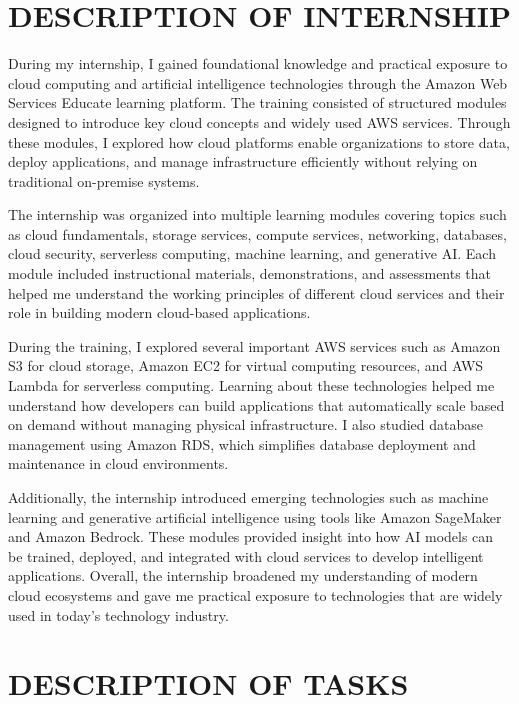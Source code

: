 \documentclass[12pt, a4paper, oneside]{report}
\begin{document}
\chapter{DESCRIPTION OF INTERNSHIP}

During my internship, I gained foundational knowledge and practical exposure to cloud 
computing and artificial intelligence technologies through the Amazon Web Services 
Educate learning platform. The training consisted of structured modules designed to 
introduce key cloud concepts and widely used AWS services. Through these modules, I 
explored how cloud platforms enable organizations to store data, deploy applications, 
and manage infrastructure efficiently without relying on traditional on-premise systems.

The internship was organized into multiple learning modules covering topics such as 
cloud fundamentals, storage services, compute services, networking, databases, cloud 
security, serverless computing, machine learning, and generative AI. Each module 
included instructional materials, demonstrations, and assessments that helped me 
understand the working principles of different cloud services and their role in building 
modern cloud-based applications.

During the training, I explored several important AWS services such as Amazon S3 for 
cloud storage, Amazon EC2 for virtual computing resources, and AWS Lambda for 
serverless computing. Learning about these technologies helped me understand how 
developers can build applications that automatically scale based on demand without 
managing physical infrastructure. I also studied database management using Amazon 
RDS, which simplifies database deployment and maintenance in cloud environments.

Additionally, the internship introduced emerging technologies such as machine 
learning and generative artificial intelligence using tools like Amazon SageMaker 
and Amazon Bedrock. These modules provided insight into how AI models can be 
trained, deployed, and integrated with cloud services to develop intelligent applications. 
Overall, the internship broadened my understanding of modern cloud ecosystems and 
gave me practical exposure to technologies that are widely used in today's technology 
industry.


\chapter{DESCRIPTION OF TASKS}
\end{document}
